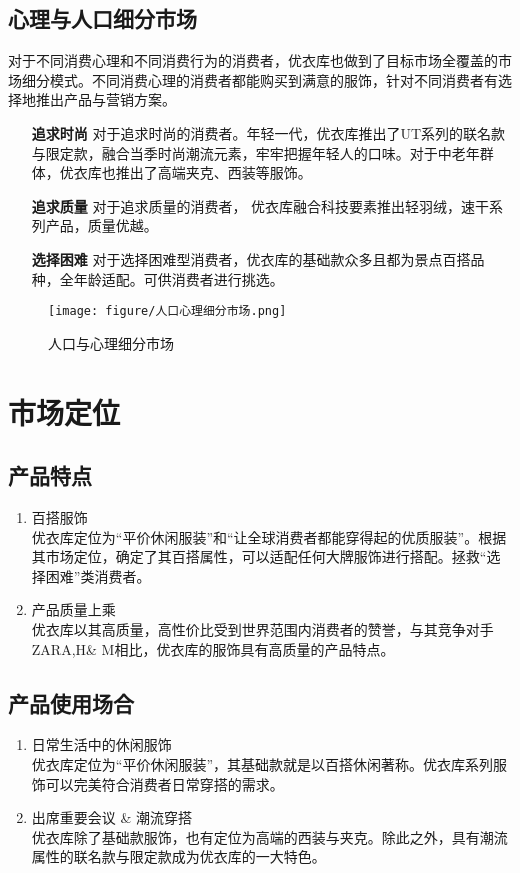 \documentclass{xjtureport}
\begin{document}
\subsection{心理与人口细分市场}
    对于不同消费心理和不同消费行为的消费者，优衣库也做到了目标市场全覆盖的市场细分模式。不同消费心理的消费者都能购买到满意的服饰，针对不同消费者有选择地推出产品与营销方案。
    \begin{itemize}
        \item[\textbf{追求时尚}] 对于追求时尚的消费者。年轻一代，优衣库推出了UT系列的联名款与限定款，融合当季时尚潮流元素，牢牢把握年轻人的口味。对于中老年群体，优衣库也推出了高端夹克、西装等服饰。
        \item[\textbf{追求质量}] 对于追求质量的消费者， 优衣库融合科技要素推出轻羽绒，速干系列产品，质量优越。
        \item[\textbf{选择困难}] 对于选择困难型消费者，优衣库的基础款众多且都为景点百搭品种，全年龄适配。可供消费者进行挑选。 
    \end{itemize}
    \begin{figure}[H]
        \centering
        \texttt{[image: figure/人口心理细分市场.png]}
        \caption{人口与心理细分市场}
    \end{figure}


\section{市场定位}
\subsection{产品特点}
\begin{enumerate}
    \item 百搭服饰\\
    优衣库定位为“平价休闲服装”和“让全球消费者都能穿得起的优质服装”。根据其市场定位，确定了其百搭属性，可以适配任何大牌服饰进行搭配。拯救“选择困难”类消费者。
    \item 产品质量上乘\\
    优衣库以其高质量，高性价比受到世界范围内消费者的赞誉，与其竞争对手ZARA,H\& M相比，优衣库的服饰具有高质量的产品特点。
\end{enumerate}
\subsection{产品使用场合}
\begin{enumerate}
    \item 日常生活中的休闲服饰\\
    优衣库定位为“平价休闲服装”，其基础款就是以百搭休闲著称。优衣库系列服饰可以完美符合消费者日常穿搭的需求。
    \item 出席重要会议 \& 潮流穿搭\\
优衣库除了基础款服饰，也有定位为高端的西装与夹克。除此之外，具有潮流属性的联名款与限定款成为优衣库的一大特色。
\end{enumerate}
\end{document}
